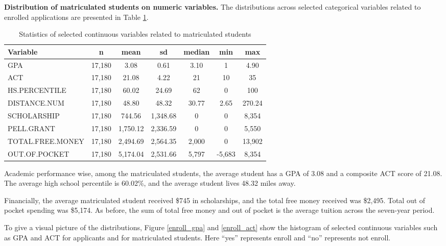 \documentclass[12pt,english]{report}
\begin{document}
\vspace{0.15in}
\noindent \textbf{Distribution of matriculated students on numeric variables. } The distributions   across selected categorical  variables related to enrolled applications  are presented in Table \ref{continuous_matriculated}. 

\begin{table}[H]
\centering
\begin{tabular}{|l|cccccc|} \hline %
Variable         & n        & mean        & sd          & median   & min         & max       \\ \hline
GPA              & 17,180 & 3.08     & 0.61     & 3.10  & 1         & 4.90   \\
ACT              & 17,180 & 21.08    & 4.22     & 21     & 10        & 35      \\
HS.PERCENTILE    & 17,180 & 60.02    & 24.69    & 62     & 0         & 100     \\
DISTANCE.NUM     & 17,180 & 48.80    & 48.32    & 30.77 & 2.65     & 270.24 \\%
SCHOLARSHIP      & 17,180 & 744.56   & 1,348.68 & 0      & 0         & 8,354   \\
PELL.GRANT       & 17,180 & 1,750.12 & 2,336.59 & 0      & 0         & 5,550   \\
TOTAL.FREE.MONEY & 17,180 & 2,494.69 & 2,564.35 & 2,000  & 0         & 13,902  \\ 
OUT.OF.POCKET  & 17,180 & 5,174.04 & 2,531.66 & 5,797  & -5,683 & 8,354   \\ \hline %
\end{tabular}
\caption{Statistics of selected continuous variables related to matriculated students }
\label{continuous_matriculated}
\end{table}
Academic performance wise, among the matriculated students, the average student has a GPA of 3.08 and a composite ACT score of 21.08. The average high school percentile is 60.02\%, and the average student lives 48.32 miles away.

Financially, the average matriculated student received \$745 in scholarships, and the total free money received was \$2,495. Total out of pocket spending was \$5,174. As before, the sum of total free money and out of pocket is the average tuition across the seven-year period.

To give a visual picture of the distributions,  Figure \ref{enroll_gpa} and \ref{enroll_act} show the histogram of selected continuous variables such as GPA and ACT for applicants and for matriculated students. Here ``yes'' represents enroll and ``no'' represents not enroll. 
\end{document}

